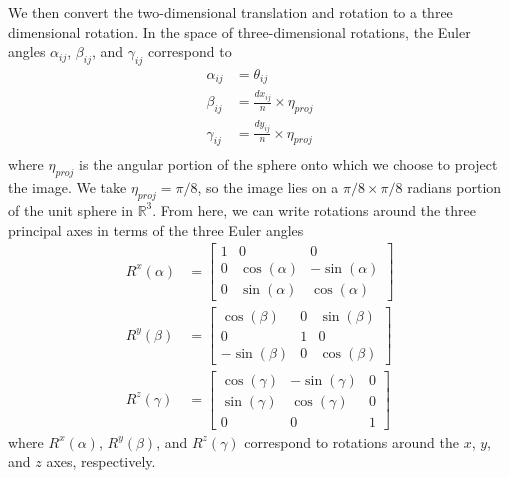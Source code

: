 \documentclass{pnastwo}
\begin{document}
\begin{article}
\begin{materials}
%
%
We then convert the two-dimensional translation and rotation to a three dimensional rotation. 
%
In the space of three-dimensional rotations, the Euler angles $\alpha_{ij}$, $\beta_{ij}$, and $\gamma_{ij}$ correspond to
\begin{equation} \label{eq:angle_relations}
\begin{aligned}
	\alpha_{ij} &= \theta_{ij} \\
	\beta_{ij} &= \frac{dx_{ij}}{n} \times \eta_{proj} \\
	\gamma_{ij} &= \frac{dy_{ij}}{n} \times \eta_{proj} \\
\end{aligned}
\end{equation}
where $\eta_{proj}$ is the angular portion of the sphere onto which we choose to project the image.
%
We take $\eta_{proj} =  \pi/8$, so the image lies on a $\pi/8 \times \pi/8$ radians portion of the unit sphere in $\mathbb{R}^3$.
%
From here, we can write rotations around the three principal axes in terms of the three Euler angles
\begin{equation}
\begin{aligned}
	R^x(\alpha) &= \begin{bmatrix}
	1 & 0 & 0 \\
    0 & \cos(\alpha) & -\sin(\alpha) \\
    0 & \sin(\alpha) & \cos(\alpha)
	\end{bmatrix} \\
	R^y(\beta) &= \begin{bmatrix}
	\cos(\beta) & 0 & \sin(\beta) \\
    0 & 1 & 0 \\
    -\sin(\beta) & 0 & \cos(\beta)
    \end{bmatrix} \\
	R^z(\gamma) &= \begin{bmatrix} 
	\cos(\gamma) & -\sin(\gamma) & 0 \\
    \sin(\gamma) & \cos(\gamma) & 0 \\
    0 & 0 & 1 
    \end{bmatrix}
\end{aligned}
\end{equation}
where $R^x(\alpha)$, $R^y(\beta)$, and $R^z(\gamma)$ correspond to rotations around the $x$, $y$, and $z$ axes, respectively.

\end{materials}
\end{article}
\end{document}
